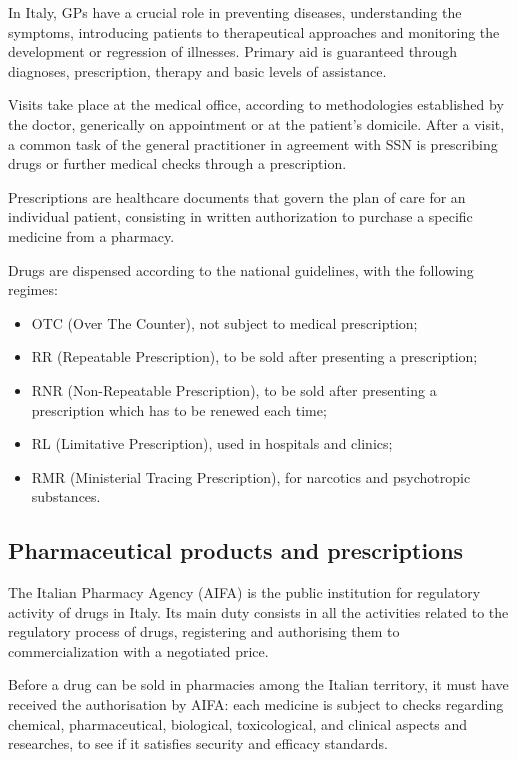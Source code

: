 In Italy, GPs have a crucial role in preventing diseases, understanding the symptoms, introducing patients to therapeutical approaches and monitoring the development or regression of illnesses\cite{gp}. Primary aid is guaranteed through diagnoses, prescription, therapy and basic levels of assistance.

Visits take place at the medical office, according to methodologies established by the doctor, generically on appointment or at the patient's domicile. After a visit, a common task of the general practitioner in agreement with SSN is prescribing drugs or further medical checks through a prescription.

Prescriptions are healthcare documents that govern the plan of care for an individual patient\cite{ascpt}, consisting in written authorization to purchase a specific medicine from a pharmacy.

Drugs are dispensed according to the national guidelines\cite{ricette}, with the following regimes:
\begin{itemize}
	\item OTC (Over The Counter), not subject to medical prescription;
	\item RR (Repeatable Prescription), to be sold after presenting a prescription;
	\item RNR (Non-Repeatable Prescription), to be sold after presenting a prescription which has to be renewed each time;
	\item RL (Limitative Prescription), used in hospitals and clinics;
	\item RMR (Ministerial Tracing Prescription), for narcotics and psychotropic substances.
\end{itemize}

\subsection{Pharmaceutical products and prescriptions}  
The Italian Pharmacy Agency (AIFA) is the public institution for regulatory activity of drugs in Italy. Its main duty consists in all the activities related to the regulatory process of drugs, registering and authorising them to commercialization with a negotiated price. 

Before a drug can be sold in pharmacies among the Italian territory, it must have received the authorisation by AIFA: each medicine is subject to checks regarding chemical, pharmaceutical, biological, toxicological, and clinical aspects and researches, to see if it satisfies security and efficacy standards\cite{aic}.

